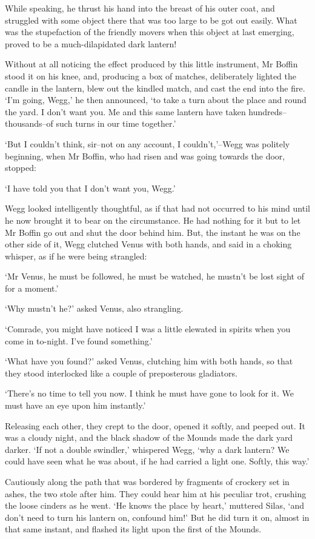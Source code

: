 While speaking, he thrust his hand into the breast of his outer coat,
and struggled with some object there that was too large to be got out
easily. What was the stupefaction of the friendly movers when this
object at last emerging, proved to be a much-dilapidated dark lantern!

Without at all noticing the effect produced by this little instrument,
Mr Boffin stood it on his knee, and, producing a box of matches,
deliberately lighted the candle in the lantern, blew out the kindled
match, and cast the end into the fire. ‘I’m going, Wegg,’ he then
announced, ‘to take a turn about the place and round the yard. I don’t
want you. Me and this same lantern have taken hundreds--thousands--of
such turns in our time together.’

‘But I couldn’t think, sir--not on any account, I couldn’t,’--Wegg was
politely beginning, when Mr Boffin, who had risen and was going towards
the door, stopped:

‘I have told you that I don’t want you, Wegg.’

Wegg looked intelligently thoughtful, as if that had not occurred to his
mind until he now brought it to bear on the circumstance. He had nothing
for it but to let Mr Boffin go out and shut the door behind him. But,
the instant he was on the other side of it, Wegg clutched Venus
with both hands, and said in a choking whisper, as if he were being
strangled:

‘Mr Venus, he must be followed, he must be watched, he mustn’t be lost
sight of for a moment.’

‘Why mustn’t he?’ asked Venus, also strangling.

‘Comrade, you might have noticed I was a little elewated in spirits when
you come in to-night. I’ve found something.’

‘What have you found?’ asked Venus, clutching him with both hands, so
that they stood interlocked like a couple of preposterous gladiators.

‘There’s no time to tell you now. I think he must have gone to look for
it. We must have an eye upon him instantly.’

Releasing each other, they crept to the door, opened it softly, and
peeped out. It was a cloudy night, and the black shadow of the Mounds
made the dark yard darker. ‘If not a double swindler,’ whispered Wegg,
‘why a dark lantern? We could have seen what he was about, if he had
carried a light one. Softly, this way.’

Cautiously along the path that was bordered by fragments of crockery set
in ashes, the two stole after him. They could hear him at his peculiar
trot, crushing the loose cinders as he went. ‘He knows the place by
heart,’ muttered Silas, ‘and don’t need to turn his lantern on, confound
him!’ But he did turn it on, almost in that same instant, and flashed
its light upon the first of the Mounds.

